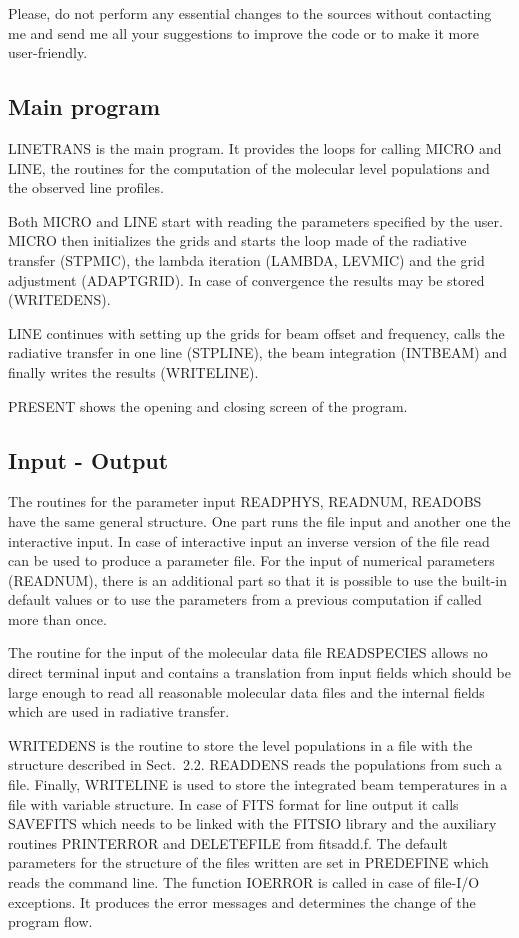 Please, do not perform any essential changes to the sources without 
contacting me and send me all your suggestions to improve the code or
to make it more user-friendly.

\subsection{Main program}

LINETRANS is the main program. It provides the loops for calling
MICRO and LINE, the routines for the computation of the molecular
level populations and the observed line profiles.

Both MICRO and LINE start with reading the parameters specified
by the user. MICRO then initializes the grids and starts the
loop made of the radiative transfer (STPMIC), the lambda iteration
(LAMBDA, LEVMIC) and the grid adjustment (ADAPTGRID). In case
of convergence the results may be stored (WRITEDENS).

LINE continues with setting up the grids for beam offset and frequency,
calls the radiative transfer in one line (STPLINE), the beam 
integration (INTBEAM) and finally writes the results (WRITELINE).

PRESENT shows the opening and closing screen of the program.

\subsection{Input - Output}

The routines for the parameter input READPHYS, READNUM, READOBS
have the same general structure. One part runs the file input
and another one the interactive input. In case of interactive
input an inverse version of the file read can be used to produce
a parameter file.
For the input of numerical parameters (READNUM), there is an
additional part so that it is
possible to use the built-in default values or to use the 
parameters from a previous computation if called more than once.

The routine for the input of the molecular data file READSPECIES
allows no direct terminal input and contains a translation from
input fields which should be large enough to read all reasonable
molecular data files and the internal fields which are used
in radiative transfer.

WRITEDENS is the routine to store the level populations in a file 
with the structure described in Sect.\ 2.2. READDENS reads the
populations from such a file. Finally, WRITELINE is used
to store the integrated beam temperatures in a file with
variable structure. In case of FITS format for line output
it calls SAVEFITS which needs to be linked with the FITSIO
library and the auxiliary routines PRINTERROR and DELETEFILE
from fitsadd.f. The default parameters for the structure
of the files written are set in PREDEFINE which reads the command 
line. The function IOERROR is called in case of
file-I/O exceptions. It produces the error messages and determines
the change of the program flow.

